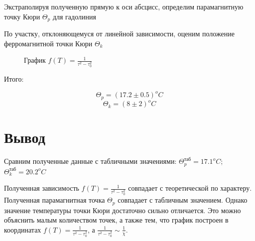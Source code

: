\documentclass[a4paper, 12pt]{article}
\begin{document}
        Экстраполируя полученную прямую к оси абсцисс, определим парамагнитную точку Кюри $\Theta_p$ для гадолиния

        По участку, отклоняющемуся от линейной зависимости, оценим положение ферромагнитной точки Кюри $\Theta_k$

        \begin{figure}[h]
            \caption{График $f(T) = \frac{1}{\tau^2 - \tau_0^2}$}
            \label{img:plot}
        \end{figure}

        Итого:

        $$
            \Theta_p = (17.2 \pm 0.5)^oC
        $$
        $$
            \Theta_k = (8 \pm 2)^oC
        $$

    \section{Вывод}

        Сравним полученные данные с табличными значениями: $\Theta_p^{таб} = 17.1^oC$; $\Theta_k^{таб} = 20.2^oC$

        Полученная зависимость $f(T) = \frac{1}{\tau^2 - \tau_0^2}$ совпадает с теоретической по характеру. Полученная парамагнитная точка $\Theta_p$ совпадает с табличным значением. Однако значение температуры точки Кюри достаточно сильно отличается. Это можно объяснить малым количеством точек, а также тем, что график построен в координатах $f(T) = \frac{1}{\tau^2 - \tau_0^2}$, а $\frac{1}{\tau^2 - \tau_0^2} \sim \frac{1}{\chi}$.
\end{document}
